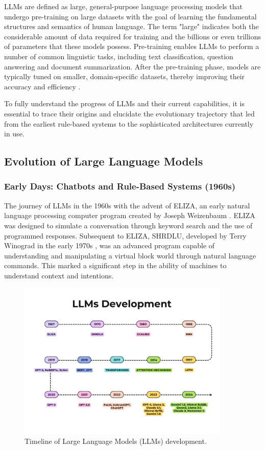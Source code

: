 LLMs are defined as large, general-purpose language processing models that undergo pre-training on large datasets with the goal of learning the fundamental structures and semantics of human language. The term "large" indicates both the considerable amount of data required for training and the billions or even trillions of parameters that these models possess. Pre-training enables LLMs to perform a number of common linguistic tasks, including text classification, question answering and document summarization. After the pre-training phase, models are typically tuned on smaller, domain-specific datasets, thereby improving their accuracy and efficiency \cite{researchgraph2024}.

To fully understand the progress of LLMs and their current capabilities, it is essential to trace their origins and elucidate the evolutionary trajectory that led from the earliest rule-based systems to the sophisticated architectures currently in use.

\subsection{Evolution of Large Language Models}

\subsubsection{Early Days: Chatbots and Rule-Based Systems (1960s)}

The journey of LLMs in the 1960s with the advent of ELIZA, an early natural language processing computer program created by Joseph Weizenbaum \cite{weizenbaum1966eliza}. ELIZA was designed to simulate a conversation through keyword search and the use of programmed responses. Subsequent to ELIZA, SHRDLU, developed by Terry Winograd in the early 1970s \cite{winograd1972understanding}, was an advanced program capable of understanding and manipulating a virtual block world through natural language commands. This marked a significant step in the ability of machines to understand context and intentions.

\begin{figure}[h!]
    \centering
    \includegraphics[width=0.9\textwidth]{images/llms/llms-timeline.png}
    \caption{Timeline of Large Language Models (LLMs) development.}
    \label{fig:llms-history}
\end{figure}

